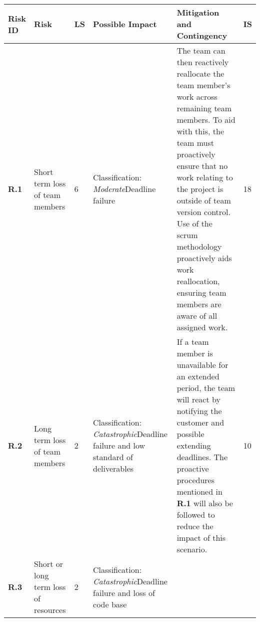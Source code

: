 \begin{longtable}[H]{| p{0.6cm} | p{2cm} | p{0.3cm} | p{2.6cm} | p{8.1cm} | p{0.7cm} |}
    \hline
    \cellcolor{titleColor}\textbf{Risk ID}   & \cellcolor{titleColor}\textbf{Risk}                                             &\cellcolor{titleColor}\textbf{LS}        & \cellcolor{titleColor}\textbf{Possible Impact}                                 & \cellcolor{titleColor}\textbf{Mitigation and Contingency} & \cellcolor{titleColor}\textbf{IS} \\ \hline                                                                                                                                                                                                                                                                                                                                                                                                                                                                                                                                
    \textbf{R.1}   & Short term loss of team members                  & 6       & Classification: \newline\textit{Moderate}\newline Deadline failure                                        
      &  The team can then reactively reallocate the team member's work across remaining team members. To aid with this, the team must proactively ensure that no work relating to the project is outside of team version control. Use of the scrum methodology proactively aids work reallocation, ensuring team members are aware of all assigned work. 
      & 18    \\ \hline
    \textbf{R.2}    & Long term loss of team members                   & 2 & Classification: \newline\textit{Catastrophic}\newline Deadline failure and low standard of deliverables 
    & If a team member is unavailable for an extended period, the team will react by notifying the customer and possible extending deadlines. The proactive procedures mentioned in \textbf{R.1} will also be followed to reduce the impact of this scenario.                                                                                                                                                                                                                                                                                            
    & 10    \\ \hline
    \textbf{R.3}     & Short or long term loss of resources             & 2 & Classification: \newline\textit{Catastrophic}\newline Deadline failure and loss of code base              

\end{longtable}
